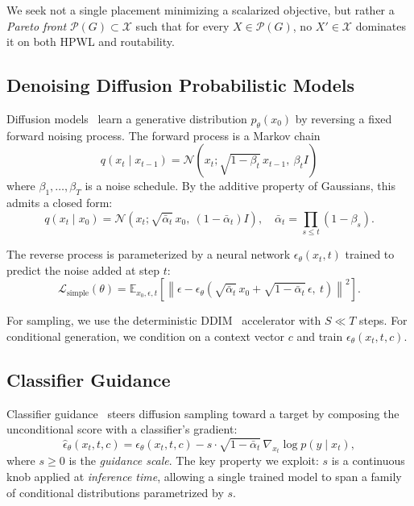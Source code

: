 We seek not a single placement minimizing a scalarized objective, but rather a \emph{Pareto front} $\mathcal{P}(G) \subset \mathcal{X}$ such that for every $X \in \mathcal{P}(G)$, no $X' \in \mathcal{X}$ dominates it on both HPWL and routability.

\subsection{Denoising Diffusion Probabilistic Models}

Diffusion models~\cite{sohl2015deep, ho2020ddpm} learn a generative distribution $p_\theta(x_0)$ by reversing a fixed forward noising process. The forward process is a Markov chain
\begin{equation}
q(x_t \mid x_{t-1}) = \mathcal{N}(x_t; \sqrt{1 - \beta_t}\, x_{t-1},\ \beta_t I)
\end{equation}
where $\beta_1, \dots, \beta_T$ is a noise schedule. By the additive property of Gaussians, this admits a closed form:
\begin{equation}
q(x_t \mid x_0) = \mathcal{N}(x_t; \sqrt{\bar{\alpha}_t}\, x_0,\ (1 - \bar{\alpha}_t) I), \quad \bar{\alpha}_t = \prod_{s \le t}(1 - \beta_s).
\end{equation}

The reverse process is parameterized by a neural network $\epsilon_\theta(x_t, t)$ trained to predict the noise added at step $t$:
\begin{equation}
\mathcal{L}_\textrm{simple}(\theta) = \mathbb{E}_{x_0, \epsilon, t}\left[\left\|\epsilon - \epsilon_\theta(\sqrt{\bar{\alpha}_t}\, x_0 + \sqrt{1 - \bar{\alpha}_t}\, \epsilon,\ t)\right\|^2\right].
\label{eq:ddpm_loss}
\end{equation}

For sampling, we use the deterministic DDIM~\cite{song2021ddim} accelerator with $S \ll T$ steps. For conditional generation, we condition on a context vector $c$ and train $\epsilon_\theta(x_t, t, c)$.

\subsection{Classifier Guidance}

Classifier guidance~\cite{dhariwal2021guidance} steers diffusion sampling toward a target by composing the unconditional score with a classifier's gradient:
\begin{equation}
\hat{\epsilon}_\theta(x_t, t, c) = \epsilon_\theta(x_t, t, c) - s \cdot \sqrt{1 - \bar{\alpha}_t}\, \nabla_{x_t} \log p(y \mid x_t),
\label{eq:guidance}
\end{equation}
where $s \ge 0$ is the \emph{guidance scale}. The key property we exploit: $s$ is a continuous knob applied at \emph{inference time}, allowing a single trained model to span a family of conditional distributions parametrized by $s$.


